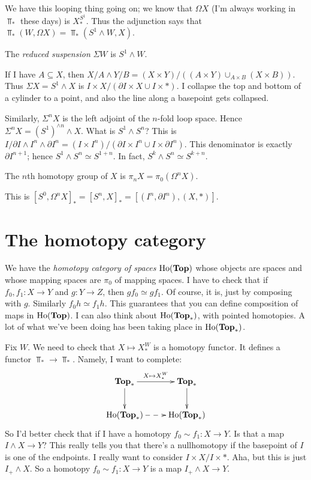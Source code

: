 We have this looping thing going on; we know that $\Omega X$ (I'm always working in $\Top_\ast$ these days) is $X^{S^1}_\ast$. Thus the adjunction says that $\Top_\ast(W,\Omega X) = \Top_\ast(S^1\wedge W,X)$.
\begin{definition}
    The \emph{reduced suspension} $\Sigma W$ is $S^1\wedge W$.
\end{definition}
If I have $A\subseteq X$, then $X/A\wedge Y/B = (X\times Y)/((A\times Y)\cup_{A\times B}(X\times B))$. Thus $\Sigma X = S^1\wedge X$ is $I\times X/(\partial I \times X\cup I\times \ast)$. I collapse the top and bottom of a cylinder to a point, and also the line along a basepoint gets collapsed.

Similarly, $\Sigma^n X$ is the left adjoint of the $n$-fold loop space. Hence $\Sigma^n X = (S^1)^{\wedge n}\wedge X$. What is $S^1\wedge S^n$? This is $I/\partial I\wedge I^n\wedge \partial I^n = (I\times I^n)/(\partial I\times I^n\cup I\times \partial I^n)$. This denominator is exactly $\partial I^{n+1}$; hence $S^1\wedge S^n\simeq S^{1+n}$. In fact, $S^k\wedge S^n\simeq S^{k+n}$.
\begin{definition}
    The $n$th homotopy group of $X$ is $\pi_n X = \pi_0(\Omega^n X)$.
\end{definition}
This is $[S^0,\Omega^n X]_\ast = [S^n, X]_\ast = [(I^n,\partial I^n),(X,\ast)]$.
\section{The homotopy category}
We have the \emph{homotopy category of spaces} $\mathrm{Ho}(\mathbf{Top})$ whose objects are spaces and whose mapping spaces are $\pi_0$ of mapping spaces. I have to check that if $f_0,f_1:X\to Y$ and $g:Y\to Z$, then $gf_0\simeq gf_1$. Of course, it is, just by composing with $g$. Similarly $f_0h\simeq f_1h$. This guarantees that you can define composition of maps in $\mathrm{Ho}(\mathbf{Top})$. I can also think about $\mathrm{Ho}(\mathbf{Top}_\ast)$, with pointed homotopies. A lot of what we've been doing has been taking place in $\mathrm{Ho}(\mathbf{Top}_\ast)$.

Fix $W$. We need to check that $X\mapsto X^W_\ast$ is a homotopy functor. It defines a functor $\Top_\ast\to\Top_\ast$. Namely, I want to complete:
\begin{equation*}
    \xymatrix{
	\Top_\ast\ar[d]\ar[r]^{X\mapsto X^W_\ast} & \Top_\ast\ar[d]\\
	\Ho(\Top_\ast)\ar@{-->}[r] & \Ho(\Top_\ast)
    }
\end{equation*}
So I'd better check that if I have a homotopy $f_0\sim f_1:X\to Y$. Is that a map $I\wedge X\to Y$? This really tells you that there's a nullhomotopy if the basepoint of $I$ is one of the endpoints. I really want to consider $I\times X/I\times\ast$. Aha, but this is just $I_+\wedge X$. So a homotopy $f_0\sim f_1:X\to Y$ is a map $I_+\wedge X\to Y$.

